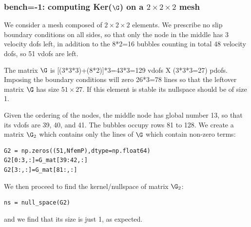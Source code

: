 \subsubsection*{bench=-1: computing Ker($\G$) on a $2\times 2 \times 2$ mesh}

We consider a mesh composed of $2\times 2\times 2$ elements. We prescribe no slip boundary conditions 
on all sides, so that only the node in the middle has 3 velocity dofs left, in addition 
to the 8*2=16 bubbles counting in total 48 velocity dofs, so 51 vdofs are left.

The matrix $\G$ is [(3*3*3)+(8*2)]*3=43*3=129 vdofs X (3*3*3=27) pdofs. 
Imposing the boundary conditions will zero 26*3=78 lines so that the leftover matrix $\G$
has size $51\times 27$. If this element is stable its nullspace should be of size 1. 

Given the ordering of the nodes, the middle node has global number 13, so that 
its vdofs are 39, 40, and 41. The bubbles occupy rows 81 to 128. 
We create a matrix $\G_2$ which contains only the lines of $\G$ which contain non-zero terms:
\begin{lstlisting}
G2 = np.zeros((51,NfemP),dtype=np.float64)
G2[0:3,:]=G_mat[39:42,:] 
G2[3:,:]=G_mat[81:,:]    
\end{lstlisting}
We then proceed to find the kernel/nullspace of matrix $\G_2$:
\begin{lstlisting}
ns = null_space(G2)
\end{lstlisting}
and we find that its size is just 1, as expected. 


